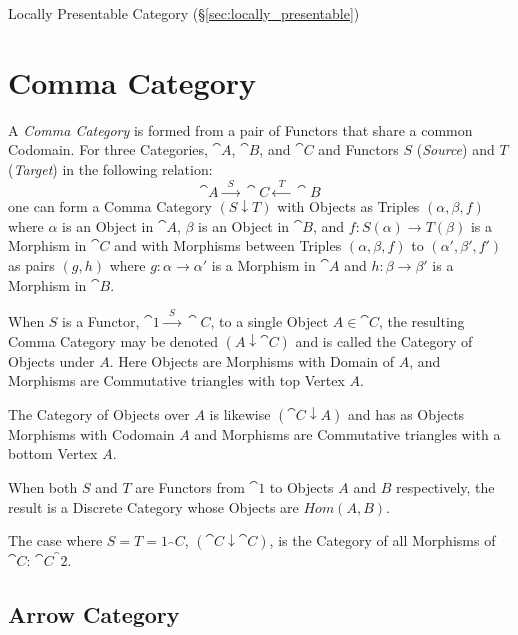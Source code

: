 \fist Locally Presentable Category (\S\ref{sec:locally_presentable})



\section{Comma Category}\label{sec:comma_category}

A \emph{Comma Category} is formed from a pair of Functors that share a
common Codomain. For three Categories, $\cat{A}$, $\cat{B}$, and
$\cat{C}$ and Functors $S$ (\emph{Source}) and $T$ (\emph{Target}) in
the following relation:
\[
  \cat{A} \xrightarrow{\;\; S\;\;} \cat{C} \xleftarrow{\;\;
    T\;\;} \cat{B}
\]
one can form a Comma Category $(S \downarrow T)$ with Objects as
Triples $(\alpha, \beta, f)$ where $\alpha$ is an Object in
$\cat{A}$, $\beta$ is an Object in $\cat{B}$, and $f : S(\alpha)
\rightarrow T(\beta)$ is a Morphism in $\cat{C}$ and with Morphisms
between Triples $(\alpha, \beta, f)$ to $(\alpha', \beta', f')$ as
pairs $(g,h)$ where $g : \alpha \rightarrow \alpha'$ is a Morphism in
$\cat{A}$ and $h : \beta \rightarrow \beta'$ is a Morphism in
$\cat{B}$.

When $S$ is a Functor, $\cat{1} \xrightarrow{\;\;S\;\;}
\cat{C}$, to a single Object $A \in \cat{C}$, the resulting
Comma Category may be denoted $(A \downarrow \cat{C})$ and is
called the Category of Objects under $A$. Here Objects are Morphisms
with Domain of $A$, and Morphisms are Commutative triangles with top
Vertex $A$.

The Category of Objects over $A$ is likewise $(\cat{C} \downarrow
A)$ and has as Objects Morphisms with Codomain $A$ and Morphisms are
Commutative triangles with a bottom Vertex $A$.

When both $S$ and $T$ are Functors from $\cat{1}$ to Objects $A$
and $B$ respectively, the result is a Discrete Category whose Objects
are $Hom(A,B)$.

The case where $S = T = 1_\cat{C}$, $(\cat{C} \downarrow
\cat{C})$, is the Category of all Morphisms of $\cat{C}$:
$\cat{C}^\cat{2}$.



\subsection{Arrow Category}\label{sec:arrow_category}

